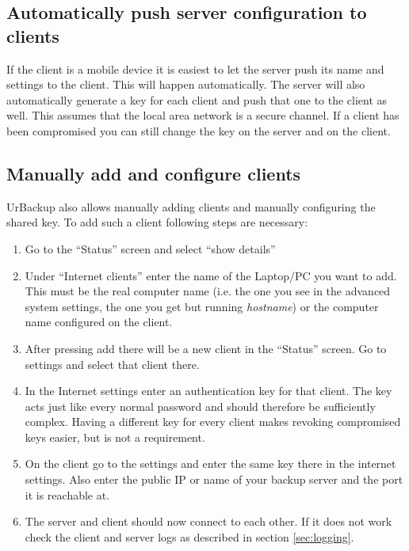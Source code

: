 \documentclass[a4paper,10pt]{article} \usepackage[breaklinks=true]{hyperref}
\begin{document}
\subsection{Automatically push server configuration to clients}

If the client is a mobile device it is easiest to let the server push its name and
settings to the client. This will happen automatically. The server will also automatically
generate a key for each client and push that one to the client as well. This assumes that
the local area network is a secure channel. If a client has been compromised you can still
change the key on the server and on the client.

\subsection{Manually add and configure clients}

UrBackup also allows manually adding clients and manually configuring the shared key. To
add such a client following steps are necessary:

\begin{enumerate}
  \item Go to the ``Status'' screen and select ``show details''
  \item Under ``Internet clients'' enter the name of the Laptop/PC you want to add. This
  must be the real computer name (i.e. the one you see in the advanced system settings, the
  one you get but running \textsl{hostname}) or the computer name configured on the client.
  \item After pressing add there will be a new client in the ``Status'' screen. Go to settings
  and select that client there.
  \item In the Internet settings enter an authentication key for that client. The key acts just like every
  normal password and should therefore be sufficiently complex. Having a different key for every
  client makes revoking compromised keys easier, but is not a requirement.
  \item On the client go to the settings and enter the same key there in the internet settings.
  Also enter the public IP or name of your backup server and the port it is reachable at.
  \item The server and client should now connect to each other. If it does not work check the
  client and server logs as described in section \ref{sec:logging}.
\end{enumerate}
\end{document}
